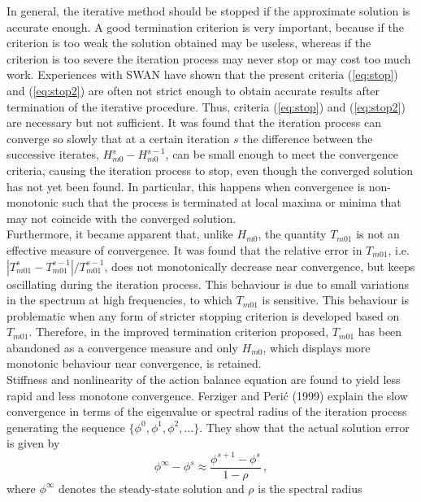 \documentclass[12pt]{book}
\begin{document}
In general, the iterative method should be stopped if the approximate solution is
accurate enough. A good termination criterion is very important, because if the criterion
is too weak the solution obtained may be useless, whereas if the criterion is too
severe the iteration process may never stop or may cost too much work.
Experiences with SWAN have shown that the present criteria (\ref{eq:stop}) and (\ref{eq:stop2}) are
often not strict enough to obtain accurate results after termination of the iterative
procedure.
Thus, criteria (\ref{eq:stop}) and (\ref{eq:stop2})
are necessary but not sufficient.
It was found that the iteration process can converge so slowly that at a certain
iteration $s$ the difference between the successive iterates, $H^s_{m0} - H^{s-1}_{m0}$,
can be small enough to meet the convergence criteria, causing the iteration process to stop, even though
the converged solution has not yet been found. In particular, this happens when convergence is non-monotonic
such that the process is terminated at local maxima or minima that may not coincide with the
converged solution.
\\[2ex]
\noindent
Furthermore, it became apparent
that, unlike $H_{m0}$, the quantity $T_{m01}$ is not an effective measure of
convergence. It was found that the relative error in $T_{m01}$, i.e.
$|T^s_{m01} - T^{s-1}_{m01}|/T^{s-1}_{m01}$, does not monotonically
decrease near convergence, but keeps
oscillating during the iteration process. This behaviour is due to small variations
in the spectrum at high frequencies, to which $T_{m01}$ is sensitive.
This
behaviour is problematic when any form of stricter stopping criterion is developed
based on $T_{m01}$. Therefore, in the improved termination criterion
proposed, $T_{m01}$ has been abandoned as a convergence
measure and only $H_{m0}$, which displays more monotonic behaviour near
convergence, is retained.
\\[2ex]
\noindent
Stiffness and nonlinearity of the action balance equation are found to yield less rapid and
less monotone convergence. Ferziger and Peri\'{c} (1999) explain the slow convergence
in terms of the eigenvalue or spectral radius of the iteration process generating the sequence
$\{{\phi}^0, {\phi}^1, {\phi}^2,...\}$. They show that the actual solution error
is given by
\begin{equation}
  {\phi}^{\infty} - {\phi}^s \approx \frac{{\phi}^{s+1} - {\phi}^s}{1-\rho} \, ,
\end{equation}
where ${\phi}^{\infty}$ denotes the steady-state solution and $\rho$ is the spectral radius
\end{document}
